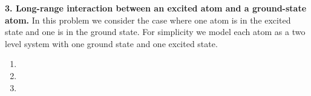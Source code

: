 \documentclass{article}
\theoremstyle{definition}
\begin{document}

\noindent \textbf{3. Long-range interaction between an excited atom and a ground-state atom.} In this problem we consider the case where one atom is in the excited state and one is in the ground state. For simplicity we model each atom as a two level system with one ground state and one excited state. 

\begin{enumerate}[label=(\alph*)]


\item 




\item 




\item



\end{enumerate}
\end{document}
